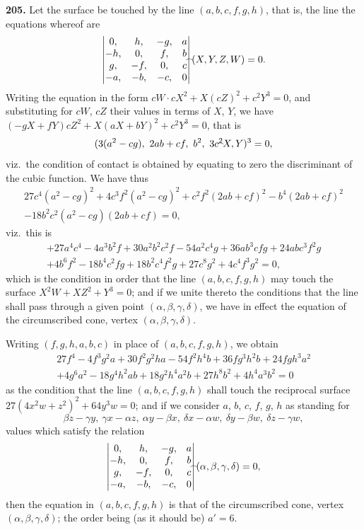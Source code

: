 \documentclass[11pt,a4paper]{article}
\theoremstyle{definition}
\begin{document}
\noindent\textbf{205.} Let the surface be touched by the line $(a,b,c,f,g,h)$, that is, the line the equations whereof are
\[
\begin{vmatrix}
0, & h, & -g, & a \\
-h, & 0, & f, & b \\
g, & -f, & 0, & c \\
-a, & -b, & -c, & 0
\end{vmatrix}
\!\hbox{\hspace{-0.5em}}\raisebox{0.3ex}{$\scriptstyle\frown$}\!(X,Y,Z,W)=0.
\]
Writing the equation in the form $cW\cdot cX^2+X(cZ)^2+c^2Y^3=0$, and substituting for $cW$, $cZ$ their values in terms of $X$, $Y$, we have $(-gX+fY)cZ^2+X(aX+bY)^2+c^2Y^3=0$, that is
\[
(3(a^2-cg),\ 2ab+cf,\ b^2,\ 3c^2\!\hbox{\hspace{-0.5em}}\raisebox{0.3ex}{$\scriptstyle\frown$}\!X,Y)^3=0,
\]
viz.\ the condition of contact is obtained by equating to zero the discriminant of the cubic function. We have thus
\begin{multline*}
27c^4(a^2-cg)^2 + 4c^3f^2(a^2-cg)^2 + c^2f^2(2ab+cf)^2 - b^4(2ab+cf)^2 \\
- 18b^2c^2(a^2-cg)(2ab+cf)=0,
\end{multline*}
viz.\ this is
\begin{multline*}
+27a^4c^4 - 4a^3b^2f + 30a^2b^2c^2f - 54a^2c^4g + 36ab^3cfg + 24abc^3f^2g \\
+ 4b^6f^2 - 18b^4c^2fg + 18b^2c^4f^2g + 27c^8g^2 + 4c^4f^3g^2=0,
\end{multline*}
which is the condition in order that the line $(a,b,c,f,g,h)$ may touch the surface $X^2W+XZ^2+Y^3=0$; and if we unite thereto the conditions that the line shall pass through a given point $(\alpha,\beta,\gamma,\delta)$, we have in effect the equation of the circumscribed cone, vertex $(\alpha,\beta,\gamma,\delta)$.

\setcounter{page}{452}

Writing $(f,g,h,a,b,c)$ in place of $(a,b,c,f,g,h)$, we obtain
\begin{multline*}
27f^4 - 4f^3g^2a + 30f^2g^2ha - 54f^2h^4b + 36fg^3h^2b + 24fgh^3a^2 \\
+ 4g^6a^2 - 18g^4h^2ab + 18g^2h^4a^2b + 27h^8b^2 + 4h^4a^3b^2=0
\end{multline*}
as the condition that the line $(a,b,c,f,g,h)$ shall touch the reciprocal surface $27(4x^2w+z^2)^2+64y^3w=0$; and if we consider $a$, $b$, $c$, $f$, $g$, $h$ as standing for
\[
\beta z-\gamma y,\ \gamma x-\alpha z,\ \alpha y-\beta x,\ \delta x-\alpha w,\ \delta y-\beta w,\ \delta z-\gamma w,
\]
values which satisfy the relation
\[
\begin{vmatrix}
0, & h, & -g, & a \\
-h, & 0, & f, & b \\
g, & -f, & 0, & c \\
-a, & -b, & -c, & 0
\end{vmatrix}
\!\hbox{\hspace{-0.5em}}\raisebox{0.3ex}{$\scriptstyle\frown$}\!(\alpha,\beta,\gamma,\delta)=0,
\]
then the equation in $(a,b,c,f,g,h)$ is that of the circumscribed cone, vertex $(\alpha,\beta,\gamma,\delta)$; the order being (as it should be) $a'=6$.
\end{document}
